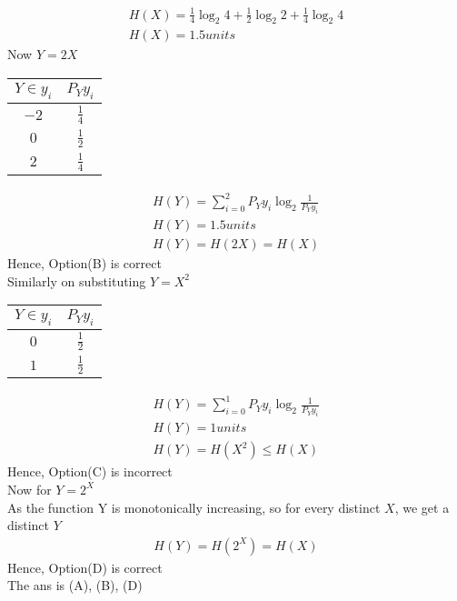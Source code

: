 \documentclass[journal,12pt,onecolumn]{IEEEtran}
\theoremstyle{remark}
\begin{document}
\begin{align}
H(X) = \frac{1}{4}\log _{2}4 + \frac{1}{2}\log _{2}2 +\frac{1}{4}\log _{2}4\\
H(X) =  1.5 units
 \end{align}
Now $ Y = 2X$
 \begin{table}[htpb]
\centering 
\begin{tabular}{|c|c|}
\hline
$Y \in y_i$	&          $P_Y{y_i}$\\
\hline
$-2$                         & $\frac{1}{4} $       \\
\hline
$0$                         & $\frac{1}{2} $ \\
\hline
$2$                         & $\frac{1}{4}$ \\
\hline
\end{tabular}
\end{table}
\begin{align}
H(Y) = \sum_{i=0}^{2}P_Y{y_i} \log _{2} \frac{1}{P_Y{y_i}}\\
H(Y) =  1.5 units\\
  H(Y) = H(2X) =H(X)
 \end{align}
 Hence, Option(B) is correct\\
 Similarly on substituting $Y = X^2$\\
  \begin{table}[htpb]
\centering 
\begin{tabular}{|c|c|}
\hline
$Y \in y_i$	&	$P_Y{y_i}$\\
\hline
$0$                         & $\frac{1}{2} $       \\
\hline
$1$                         & $\frac{1}{2} $ \\
\hline
\end{tabular}
\end{table}
 \begin{align}
H(Y) = \sum_{i=0}^{1}P_Y{y_i} \log _{2} \frac{1}{P_Y{y_i}}\\
H(Y) =  1units\\
  H(Y) = H(X^2) \leq H(X)
 \end{align}
 Hence, Option(C) is incorrect\\
 Now for $Y = 2^X$\\
 As the function Y is monotonically increasing, so for every distinct $X$, we get a distinct $Y$ 
 \begin{align}
  H(Y) = H(2^X) =  H(X) 
 \end{align}
 Hence, Option(D) is correct\\
 The ans is (A), (B), (D)
\end{document}

